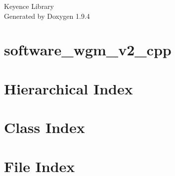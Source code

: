 \documentclass[twoside]{book}
\newcommand{\+}{\discretionary{\mbox{\scriptsize$\hookleftarrow$}}{}{}}
\newcommand{\clearemptydoublepage}{%
    \newpage{\pagestyle{empty}\cleardoublepage}%
  }
\begin{document}
  \raggedbottom
    \hypersetup{pageanchor=false,
                bookmarksnumbered=true,
                pdfencoding=unicode
               }
  \begin{titlepage}
  \vspace*{7cm}
  \begin{center}%
  {\Large Keyence Library}\\
  \vspace*{1cm}
  {\large Generated by Doxygen 1.9.4}\\
  \end{center}
  \end{titlepage}
  \clearemptydoublepage
  \tableofcontents
  \clearemptydoublepage
  \hypersetup{pageanchor=true}
\chapter{software\+\_\+wgm\+\_\+v2\+\_\+cpp}
\label{md__c___users__sami_dhiab__theion__repos_software_wgm_v2_cpp__r_e_a_d_m_e}

\chapter{Hierarchical Index}

\chapter{Class Index}

\chapter{File Index}

\end{document}
